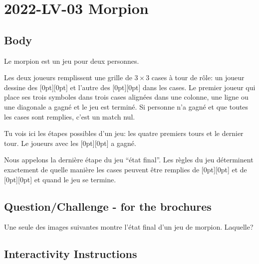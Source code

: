 \documentclass[a4paper,11pt]{report}
\newcommand{\taskGraphicsFolder}{..}
\begin{document}
\section*{\centering{} 2022-LV-03 Morpion}


\subsection*{Body}

Le morpion est un jeu pour deux personnes.

Les deux joueurs remplissent une grille de ${3 \times 3}$ cases à tour de rôle: un joueur dessine des \raisebox{-0.5ex}[0pt][0pt]{} et l’autre des \raisebox{-0.5ex}[0pt][0pt]{} dans les cases. Le premier joueur qui place ses trois symboles dans trois cases alignées dans une colonne, une ligne ou une diagonale a gagné et le jeu est terminé. Si personne n’a gagné et que toutes les cases sont remplies, c’est un match nul.

Tu vois ici les étapes possibles d’un jeu: les quatre premiers tours et le dernier tour. Le joueurs avec les \raisebox{-0.5ex}[0pt][0pt]{} a gagné.

{\centering%
\par}

Nous appelons la dernière étape du jeu “état final”. Les règles du jeu déterminent exactement de quelle manière les cases peuvent être remplies de \raisebox{-0.5ex}[0pt][0pt]{} et de \raisebox{-0.5ex}[0pt][0pt]{} et quand le jeu se termine.

{\em


\subsection*{Question/Challenge - for the brochures}

Une seule des images suivantes montre l’état final d’un jeu de morpion. Laquelle?

}


\subsection*{Interactivity Instructions}
\end{document}
